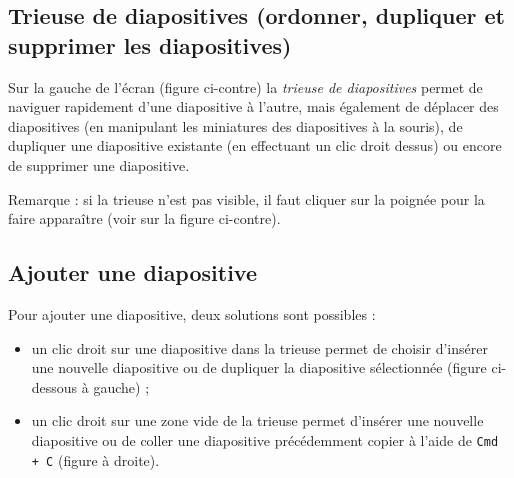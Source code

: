 \subsection{Trieuse de diapositives (ordonner, dupliquer et supprimer les diapositives)}\label{Presentation1trieuse}


\begin{minipage}[c]{.68\textwidth}
Sur la gauche de l'écran (figure ci-contre) la \emph{trieuse de diapositives} permet de naviguer rapidement d'une diapositive à l'autre, mais également de déplacer des diapositives (en manipulant les miniatures des diapositives à la souris), de dupliquer une diapositive existante (en effectuant un clic droit dessus) ou encore de supprimer une diapositive.

\vspace{1em}

Remarque : si la trieuse n'est pas visible, il faut cliquer sur la poignée pour la faire apparaître (voir  sur la figure ci-contre).

\end{minipage}\hfill%
\begin{minipage}[c]{.3\textwidth}
\centering%
\end{minipage}













\subsection{Ajouter une diapositive}\label{Presentation1nouvelleDiap}

Pour ajouter une diapositive, deux solutions sont possibles :

\begin{itemize}
\item un clic droit sur une diapositive dans la trieuse permet de choisir d'insérer une nouvelle diapositive ou de dupliquer la diapositive sélectionnée (figure ci-dessous à gauche) ;
\item un clic droit sur une zone vide de la trieuse permet d'insérer une nouvelle diapositive ou de coller une diapositive précédemment copier à l'aide de \texttt{Cmd + C} (figure à droite).  
\end{itemize}

